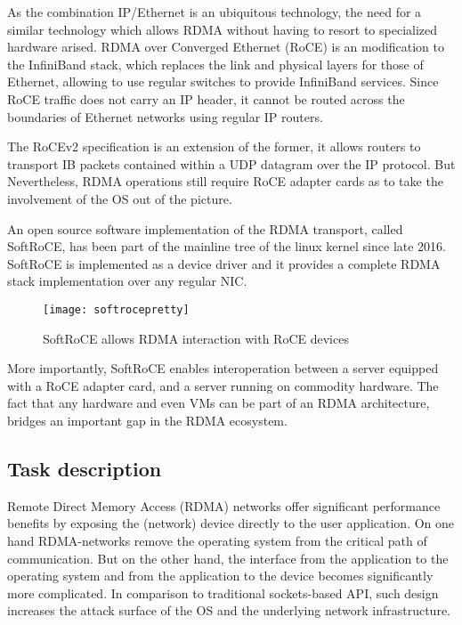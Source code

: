As the combination IP/Ethernet is an ubiquitous technology, the need for a similar technology which allows
RDMA without having to resort to specialized hardware arised. RDMA over Converged Ethernet (RoCE) is an modification
to the InfiniBand stack, which replaces the link and physical layers for those of Ethernet,
allowing to use regular switches to provide InfiniBand services. Since  RoCE traffic does not carry an IP header,
it cannot be routed across the boundaries of Ethernet networks using regular IP routers\cite{rocev2}.


The RoCEv2 specification is an extension of the former, it allows routers to transport
IB packets contained within a UDP datagram over the IP protocol. But Nevertheless, RDMA operations still require RoCE adapter
cards as to take the involvement of the OS out of the picture.

An open source software implementation of the RDMA transport, called SoftRoCE, has been part of the mainline tree of
the linux kernel since late 2016. SoftRoCE is implemented as a device driver and it provides a complete RDMA
stack implementation over any regular NIC\cite{softroce}.

\begin{figure}
  \centering
  \texttt{[image: softrocepretty]}
  \caption[softroce]{SoftRoCE allows RDMA interaction with RoCE devices\footnotemark}
\end{figure}


More importantly, SoftRoCE enables interoperation between a server equipped with a RoCE adapter card, and a server running on
commodity hardware. The fact that any hardware and even VMs can be part of an RDMA architecture, bridges an important gap in the RDMA ecosystem.



\subsection{Task description}

Remote Direct Memory Access (RDMA) networks offer significant performance benefits by exposing the (network) device directly
to the user application. On one hand RDMA-networks remove the operating system from the critical path of 
communication. But on the other hand, the interface from the application to the operating system and from 
the application to the device becomes significantly more complicated. In comparison to traditional sockets-based API, 
such design increases the attack surface of the OS and the underlying network infrastructure.

